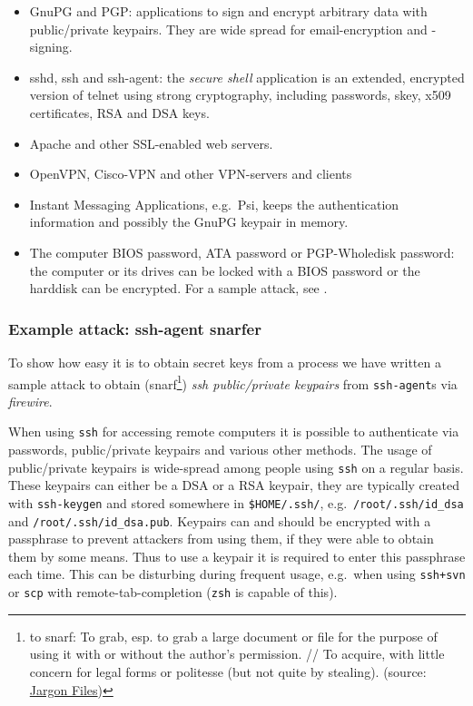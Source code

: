 \begin{itemize}

	\item GnuPG and PGP: applications to sign and encrypt arbitrary data
	with public/private keypairs. They are wide spread for email-encryption
	and -signing.

	\item sshd, ssh and ssh-agent: the \emph{secure shell} application is an
	extended, encrypted version of telnet using strong cryptography,
	including passwords, skey, x509 certificates, RSA and DSA keys.

	\item Apache and other SSL-enabled web servers.

	\item OpenVPN, Cisco-VPN and other VPN-servers and clients

	\item Instant Messaging Applications, e.g.~Psi, keeps the authentication
	information and possibly the GnuPG keypair in memory.

	\item The computer BIOS password, ATA password or PGP-Wholedisk
		password: the computer or its drives can be locked with a BIOS
		password or the harddisk can be encrypted.  For a sample attack,
		see \cite{rux2k6firewire:2006}.

\end{itemize}


\subsubsection{Example attack: ssh-agent snarfer}

\label{ssh-agent-snarfer} To show how easy it is to obtain secret keys from a
process we have written a sample attack to obtain
%
(snarf\footnote{to snarf: To grab, esp. to grab a large document or file for the
purpose of using it with or without the author's permission. // To acquire, with
little concern for legal forms or politesse (but not quite by stealing).
(source: \href{http://catb.org/jargon/html/S/snarf.html}{Jargon Files})})
%
\emph{ssh public/private keypairs} from \texttt{ssh-agent}s via \emph{firewire}.

When using \texttt{ssh} for accessing remote computers it is possible to
authenticate via passwords, public/private keypairs and various other methods.
The usage of public/private keypairs is wide-spread among people using
\texttt{ssh} on a regular basis. These keypairs can either be a DSA or a RSA
keypair, they are typically created with \texttt{ssh-keygen} and stored
somewhere in \texttt{\$HOME/.ssh/}, e.g.~\texttt{/root/.ssh/id\_dsa} and
\texttt{/root/.ssh/id\_dsa.pub}. Keypairs can and should be encrypted with a
passphrase to prevent attackers from using them, if they were able to obtain
them by some means. Thus to use a keypair it is required to enter this
passphrase each time.  This can be disturbing during frequent usage, e.g.~when
using \texttt{ssh+svn} or \texttt{scp} with remote-tab-completion (\texttt{zsh}
is capable of this).

